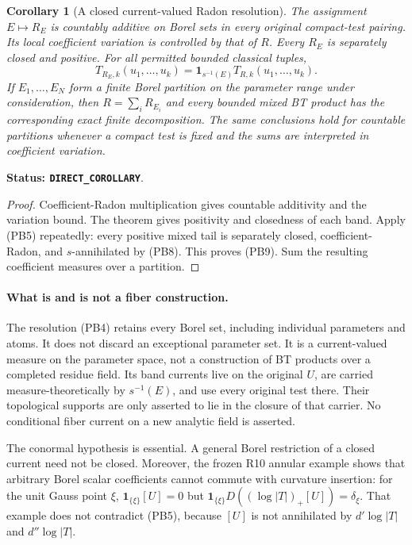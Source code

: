 \documentclass[11pt,a4paper]{article}
\numberwithin{equation}{section}
\newtheorem{corollary}[theorem]{Corollary}
\theoremstyle{definition}
\theoremstyle{remark}
\begin{document}
\begin{corollary}[A closed current-valued Radon resolution]
\label{cor:r12-current-valued-parameter-resolution}
The assignment $E\mapsto R_E$ is countably additive on Borel sets
in every original compact-test pairing. Its local coefficient
variation is controlled by that of $R$. Every $R_E$ is separately
closed and positive. For all permitted bounded classical tuples,
\[
 T_{R_E,k}(u_1,\ldots,u_k)
       =\mathbf1_{s^{-1}(E)}T_{R,k}(u_1,\ldots,u_k).
 \tag{PB9}
\]
If $E_1,\ldots,E_N$ form a finite Borel partition on the parameter
range under consideration, then $R=\sum_iR_{E_i}$ and every bounded
mixed BT product has the corresponding exact finite decomposition.
The same conclusions hold for countable partitions whenever a
compact test is fixed and the sums are interpreted in coefficient
variation.
\end{corollary}

\noindent\textbf{Status: \texttt{DIRECT\_COROLLARY}}.

\begin{proof}
Coefficient-Radon multiplication gives countable additivity and the
variation bound. The theorem gives positivity and closedness of each
band. Apply (PB5) repeatedly: every positive mixed tail is separately
closed, coefficient-Radon, and $s$-annihilated by (PB8). This proves
(PB9). Sum the resulting coefficient measures over a partition.
\end{proof}

\paragraph{What is and is not a fiber construction.}
The resolution (PB4) retains every Borel set, including individual
parameters and atoms. It does not discard an exceptional parameter
set. It is a current-valued measure on the parameter space, not a
construction of BT products over a completed residue field. Its band
currents live on the original $U$, are carried measure-theoretically
by $s^{-1}(E)$, and use every original test there. Their topological
supports are only asserted to lie in the closure of that carrier.
No conditional fiber current on a new analytic field is asserted.

The conormal hypothesis is essential. A general Borel restriction
of a closed current need not be closed. Moreover, the frozen R10
annular example shows that arbitrary Borel scalar coefficients
cannot commute with curvature insertion: for the unit Gauss point
$\xi$, $\mathbf1_{\{\xi\}}[U]=0$ but
$\mathbf1_{\{\xi\}}D((\log|T|)_+[U])=\delta_\xi$.
That example does not contradict (PB5), because $[U]$ is not
annihilated by $d'\log|T|$ and $d''\log|T|$.
\end{document}
